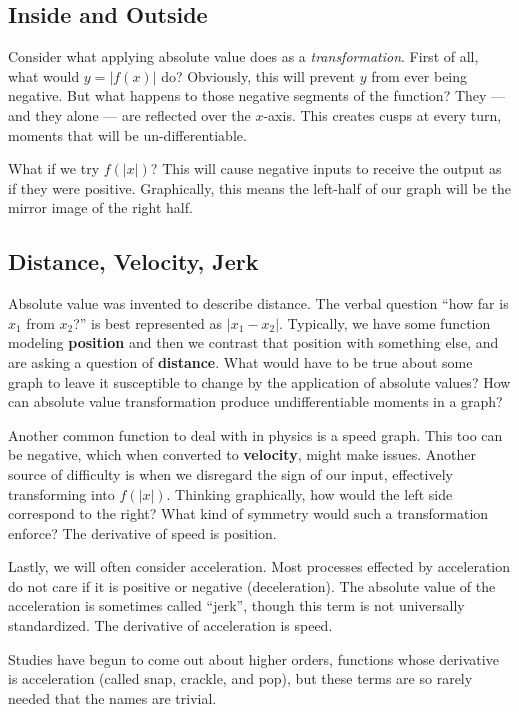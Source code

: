 
\subsection{Inside and Outside}



Consider what applying absolute value does as a \emph{transformation}.
First of all, what would $y=|f(x)|$ do?  Obviously, this will prevent $y$ from ever being negative.
But what happens to those negative segments of the function?  They --- and they alone ---
are reflected over the $x$-axis.  This creates cusps at every turn, moments that will
be un-differentiable.

What if we try $f(|x|)$?  This will cause negative inputs to receive the output as if they were
positive.  Graphically, this means the left-half of our graph will be the mirror image of the
right half.

\subsection{Distance, Velocity, Jerk}
Absolute value was invented to describe distance.  The verbal question ``how far is $x_1$ 
from $x_2$?'' is best represented as $|x_1-x_2|$.  Typically, we have some function modeling 
\textbf{position} and then we contrast that position with something else, 
and are asking a question of  \textbf{distance}.  What would have to be true about 
some graph to leave it susceptible to change 
by the application of absolute values?  How can absolute value transformation produce
undifferentiable moments in a graph?

Another common function to deal with in physics is a speed graph.  This too can be negative,
which when converted to \textbf{velocity}, might make issues. Another source of difficulty
is when we disregard the sign of our input, effectively transforming into $f(|x|)$.  Thinking
graphically, how would the left side correspond to the right?  What kind of symmetry would
such a transformation enforce?  The derivative of speed is position.

Lastly, we will often consider acceleration.  Most processes effected by acceleration 
do not care if it is positive or negative (deceleration).  The absolute value of the 
acceleration is sometimes called  ``jerk'', though this term is not universally standardized.  
The derivative of acceleration is speed.

Studies have begun to come out about higher orders, functions whose derivative is acceleration 
(called snap, crackle, and pop), but these terms are so rarely needed that the names are trivial.
  
